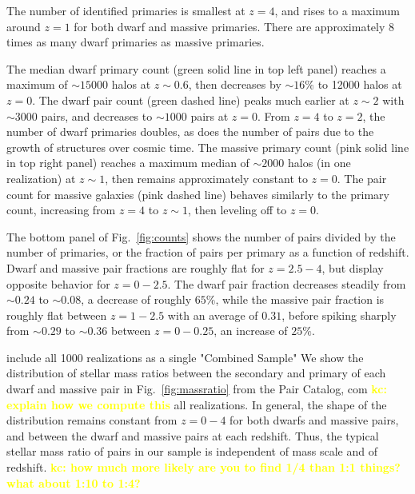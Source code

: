 \documentclass[twocolumn]{aastex631}
\newcommand{\kc}[1]{\textcolor{yellow}{\textbf{kc: #1}} }
\begin{document}
    The number of identified primaries is smallest at $z=4$, and rises to a maximum around $z=1$ for both dwarf and massive primaries.        
    There are approximately 8 times as many dwarf primaries as massive primaries. 
    
    The median dwarf primary count (green solid line in top left panel) reaches a maximum of $\sim15000$ halos at $z\sim0.6$, then decreases by $\sim16\%$ to 12000 halos at $z=0$. 
    The dwarf pair count (green dashed line) peaks much earlier at $z\sim2$ with $\sim3000$ pairs, and decreases to $\sim1000$ pairs at $z=0$.
    From $z=4$ to $z=2$, the number of dwarf primaries doubles, as does the number of pairs due to the growth of structures over cosmic time.
    The massive primary count (pink solid line in top right panel) reaches a maximum median of $\sim2000$ halos (in one realization) at $z\sim1$, then remains approximately constant to $z=0$. 
    The pair count for massive galaxies (pink dashed line) behaves similarly to the primary count, increasing from $z=4$ to $z\sim1$, then leveling off to $z=0$. 

    

    The bottom panel of Fig.~\ref{fig:counts} shows the number of pairs divided by the number of primaries, or the fraction of pairs per primary as a function of redshift. 
    Dwarf and massive pair fractions are roughly flat for $z=2.5-4$, but display opposite behavior for $z=0-2.5$. The dwarf pair fraction decreases steadily from $\sim0.24$ to $\sim0.08$, a decrease of roughly $65\%$, while the massive pair fraction is roughly flat between $z=1-2.5$ with an average of $0.31$, before spiking sharply from $\sim 0.29$ to $\sim 0.36$ between $z=0-0.25$, an increase of $25\%$.

    include all 1000 realizations as a single "Combined Sample"
    We show the distribution of stellar mass ratios between the secondary and primary of each dwarf and massive pair in Fig.~\ref{fig:massratio} from the Pair Catalog, com 
    \kc{explain how we compute this}
    all realizations.
    In general, the shape of the distribution remains constant from $z=0-4$ for both dwarfs and massive pairs, and between the dwarf and massive pairs at each redshift. 
    Thus, the typical stellar mass ratio of pairs in our sample is independent of mass scale and of redshift. \kc{how much more likely are you to find 1/4 than 1:1 things? what about 1:10 to 1:4?}
            
\end{document}
